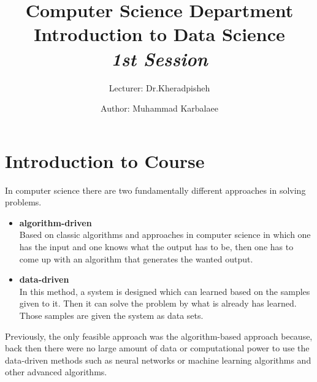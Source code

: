 \documentclass[twocolumn,a4paper, 10pt]{article}
\title{\textbf{Computer Science Department} \\ Introduction to Data Science\\ \emph{1st Session}}
\author{Lecturer: Dr.Kheradpisheh}
\date{Author: Muhammad Karbalaee}
\begin{document}
	\posttitle{\end{center}}
	\maketitle
	\section{Introduction to Course}
	In computer science there are two fundamentally different approaches 
	in solving problems.

	\begin{itemize}
		\item \textbf{algorithm-driven} \\ 
			Based on classic algorithms and approaches in computer science 
			in which one has the input and one knows what the output has to be,
			then one has to come up with an algorithm that generates the wanted output. 
		\item \textbf{data-driven} \\
			In this method, a system is designed which can learned based on the samples given to it.
			Then it can solve the problem by what is already has learned. Those samples are given 
			the system as data sets.
	\end{itemize}

	Previously, the only feasible approach was the algorithm-based approach because, back then
	there were no large amount of data or computational power to use the data-driven methods
	such as neural networks or machine learning algorithms and other advanced algorithms.
\end{document}
